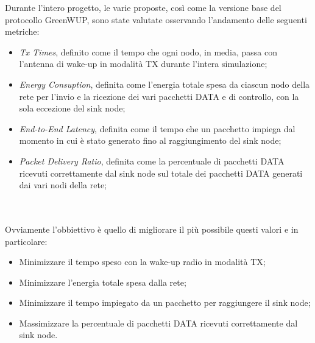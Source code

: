 Durante l'intero progetto, le varie proposte, così come la versione base del protocollo GreenWUP, sono state valutate osservando l'andamento delle seguenti metriche:

\vspace{0.3em}

\begin{itemize}
    \itemsep0em
    \item \emph{Tx Times}, definito come il tempo che ogni nodo, in media, passa con l'antenna di wake-up in modalità TX durante l'intera simulazione;
    \item \emph{Energy Consuption}, definita come l'energia totale spesa da ciascun nodo della rete per l'invio e la ricezione dei vari pacchetti DATA e di controllo, con la sola eccezione del sink node;
    \item \emph{End-to-End Latency}, definita come il tempo che un pacchetto impiega dal momento in cui è stato generato fino al raggiungimento del sink node;
    \item \emph{Packet Delivery Ratio}, definita come la percentuale di pacchetti DATA ricevuti correttamente dal sink node sul totale dei pacchetti DATA generati dai vari nodi della rete;
\end{itemize}

\\\\

Ovviamente l'obbiettivo è quello di migliorare il più possibile questi valori e in particolare:
\begin{itemize}
    \item Minimizzare il tempo speso con la wake-up radio in modalità TX;
    \item Minimizzare l'energia totale spesa dalla rete;
    \item Minimizzare il tempo impiegato da un pacchetto per raggiungere il sink node;
    \item Massimizzare la percentuale di pacchetti DATA ricevuti correttamente dal sink node.
\end{itemize}